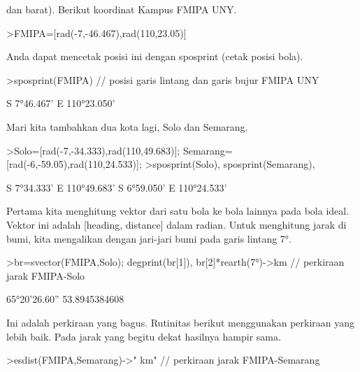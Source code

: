 \documentclass[12pt,arial,letterpaper]{book}
\begin{document}
\begin{eulernootebook}
\begin{eulercomment}
\begin{eulercomment}
\begin{eulernootebook}
\begin{eulercomment}
\begin{eulercomment}
\begin{eulercomment}
\begin{eulercomment}
\begin{eulercomment}
\begin{eulercomment}
\begin{eulernotebook}
\begin{eulercomment}
\begin{eulercomment}
\begin{eulercomment}
\begin{eulercomment}
\begin{eulercomment}
\begin{eulercomment}
\begin{eulercomment}
dan barat). Berikut koordinat Kampus FMIPA UNY.
\end{eulercomment}
\begin{eulerprompt}
>FMIPA=[rad(-7,-46.467),rad(110,23.05)]
\end{eulerprompt}
\begin{euleroutput}
  [-0.13569,  1.92657]
\end{euleroutput}
\begin{eulercomment}
Anda dapat mencetak posisi ini dengan sposprint (cetak posisi bola).
\end{eulercomment}
\begin{eulerprompt}
>sposprint(FMIPA) // posisi garis lintang dan garis bujur FMIPA UNY
\end{eulerprompt}
\begin{euleroutput}
  S 7°46.467' E 110°23.050'
\end{euleroutput}
\begin{eulercomment}
Mari kita tambahkan dua kota lagi, Solo dan Semarang.
\end{eulercomment}
\begin{eulerprompt}
>Solo=[rad(-7,-34.333),rad(110,49.683)]; Semarang=[rad(-6,-59.05),rad(110,24.533)];
>sposprint(Solo), sposprint(Semarang),
\end{eulerprompt}
\begin{euleroutput}
  S 7°34.333' E 110°49.683'
  S 6°59.050' E 110°24.533'
\end{euleroutput}
\begin{eulercomment}
Pertama kita menghitung vektor dari satu bola ke bola lainnya pada
bola ideal. Vektor ini adalah [heading, distance] dalam radian. Untuk
menghitung jarak di bumi, kita mengalikan dengan jari-jari bumi pada
garis lintang 7°.
\end{eulercomment}
\begin{eulerprompt}
>br=svector(FMIPA,Solo); degprint(br[1]), br[2]*rearth(7°)->km // perkiraan jarak FMIPA-Solo
\end{eulerprompt}
\begin{euleroutput}
  65°20'26.60''
  53.8945384608
\end{euleroutput}
\begin{eulercomment}
Ini adalah perkiraan yang bagus. Rutinitas berikut menggunakan
perkiraan yang lebih baik. Pada jarak yang begitu dekat hasilnya
hampir sama.
\end{eulercomment}
\begin{eulerprompt}
>esdist(FMIPA,Semarang)->" km" // perkiraan jarak FMIPA-Semarang

\end{eulerprompt}
\end{eulercomment}
\end{eulercomment}
\end{eulercomment}
\end{eulercomment}
\end{eulercomment}
\end{eulercomment}
\end{eulernotebook}
\end{eulercomment}
\end{eulercomment}
\end{eulercomment}
\end{eulercomment}
\end{eulercomment}
\end{eulercomment}
\end{eulernootebook}
\end{eulercomment}
\end{eulercomment}
\end{eulernootebook}
\end{document}
